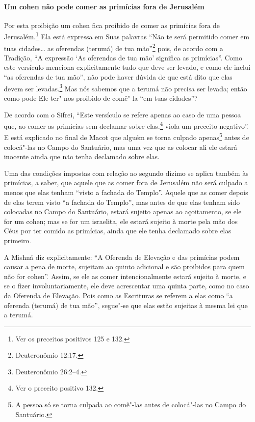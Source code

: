 \begin{multicols}{2}
\paragraph{Um cohen\starr{} não pode comer as primícias fora de Jerusalém}

Por esta proibição um cohen\starr{} fica proibido de comer as primícias fora
de Jerusalém.\footnote{Ver os preceitos positivos 125 e 132.} Ela está expressa em Suas palavras
``Não te será permitido comer em tuas cidades\ldots{} as oferendas (terumá\starr)
de tua mão''\footnote{Deuteronômio 12:17.} pois, de acordo com a Tradição, ``A
expressão `As oferendas de tua mão' significa as primícias''. Como este
versículo menciona explicitamente tudo que deve ser levado, e como ele
inclui ``as oferendas de tua mão'', não pode haver dúvida de que está
dito que elas devem ser levadas.\footnote{Deuteronômio 26:2--4.} Mas nós sabemos
que a terumá\starr{} não precisa ser levada; então como pode Ele ter"-nos
proibido de comê"-la ``em tuas cidades''?

De acordo com o Sifrei\starr, ``Este versículo se refere apenas ao caso de uma
pessoa que, ao comer as primícias sem declamar sobre
elas,\footnote{Ver o preceito positivo 132.} viola um preceito negativo''. E está
explicado no final de Macot\starr{} que alguém se torna culpado
apenas\footnote{A pessoa só se torna culpada ao comê"-las antes de colocá"-las no
Campo do Santuário.} antes de colocá"-las no Campo do Santuário,
mas uma vez que as colocar ali ele estará inocente ainda que não tenha
declamado sobre elas.

Uma das condições impostas com relação ao segundo dízimo se aplica
também às primícias, a saber, que aquele que as comer fora de Jerusalém
não será culpado a menos que elas tenham ``visto a fachada do Templo''.
Aquele que as comer depois de elas terem visto ``a fachada do Templo'',
mas antes de que elas tenham sido colocadas no Campo do Santuário,
estará sujeito apenas ao açoitamento, se ele for um cohen\starr; mas se
for um israelita, ele estará sujeito à morte pela mão dos Céus por ter
comido as primícias, ainda que ele tenha declamado sobre elas primeiro.

A Mishná\starr{} diz explicitamente: ``A Oferenda de Elevação e das primícias
podem causar a pena de morte, sujeitam ao quinto adicional e são
proibidos para quem não for cohen\starr''. Assim, se ele as comer
intencionalmente estará sujeito à morte, e se o fizer
involuntariamente, ele deve acrescentar uma quinta parte, como no caso
da Oferenda de Elevação. Pois como as Escrituras se referem a elas como
``a oferenda (terumá\starr) de tua mão'', segue"-se que elas estão sujeitas à
mesma lei que a terumá\starr.


\end{multicols}
